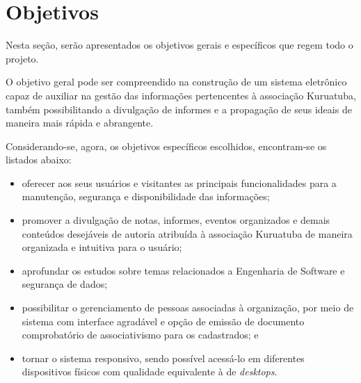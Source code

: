 \hspace{2.5cm}
\section{Objetivos}
\label{sec:telas}
\hspace{2.5cm}

Nesta seção, serão apresentados os objetivos gerais e específicos que regem todo o projeto. 

O objetivo geral pode ser compreendido na construção de um sistema eletrônico capaz de auxiliar na gestão das informações pertencentes à associação Kuruatuba, também possibilitando a divulgação de informes e a propagação de seus ideais de maneira mais rápida e abrangente.

Considerando-se, agora, os objetivos específicos escolhidos, encontram-se os listados abaixo:  
\begin{itemize}
 \item oferecer aos seus usuários e visitantes as principais funcionalidades para a manutenção, segurança e disponibilidade das informações;
 
 \item promover a divulgação de notas, informes, eventos organizados e demais conteúdos desejáveis de autoria atribuída à associação Kuruatuba de maneira organizada e intuitiva para o usuário;
 
 \item aprofundar os estudos sobre temas relacionados a Engenharia de Software e segurança de dados;
 
 \item possibilitar o gerenciamento de pessoas associadas à organização, por meio de sistema com interface agradável e opção de emissão de documento comprobatório de associativismo para os cadastrados; e
 
 \item tornar o sistema responsivo, sendo possível acessá-lo em diferentes dispositivos físicos com qualidade equivalente à de \textit{desktops}.  
\end{itemize}



